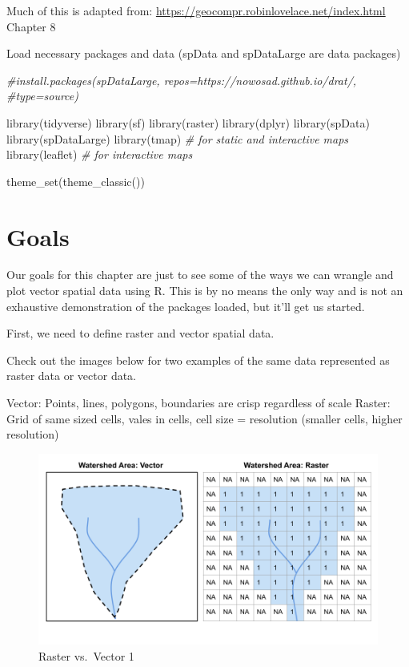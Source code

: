 \documentclass[
]{book}
\newenvironment{Shaded}{\begin{snugshade}}{\end{snugshade}}
\newcommand{\CommentTok}[1]{\textcolor[rgb]{0.56,0.35,0.01}{\textit{#1}}}
\newcommand{\FunctionTok}[1]{\textcolor[rgb]{0.00,0.00,0.00}{#1}}
\newcommand{\NormalTok}[1]{#1}
\begin{document}
Much of this is adapted from: \url{https://geocompr.robinlovelace.net/index.html} Chapter 8

Load necessary packages and data (spData and spDataLarge are data packages)

\begin{Shaded}
\begin{Highlighting}[]
\CommentTok{\#install.packages(\textquotesingle{}spDataLarge\textquotesingle{}, repos=\textquotesingle{}https://nowosad.github.io/drat/\textquotesingle{},}
\CommentTok{\#type=\textquotesingle{}source\textquotesingle{})}

\FunctionTok{library}\NormalTok{(tidyverse)}
\FunctionTok{library}\NormalTok{(sf)}
\FunctionTok{library}\NormalTok{(raster)}
\FunctionTok{library}\NormalTok{(dplyr)}
\FunctionTok{library}\NormalTok{(spData)}
\FunctionTok{library}\NormalTok{(spDataLarge)}
\FunctionTok{library}\NormalTok{(tmap)    }\CommentTok{\# for static and interactive maps}
\FunctionTok{library}\NormalTok{(leaflet) }\CommentTok{\# for interactive maps}

\FunctionTok{theme\_set}\NormalTok{(}\FunctionTok{theme\_classic}\NormalTok{())}
\end{Highlighting}
\end{Shaded}

\hypertarget{goals}{%
\section{Goals}\label{goals}}

Our goals for this chapter are just to see some of the ways we can wrangle and plot vector spatial data using R. This is by no means the only way and is not an exhaustive demonstration of the packages loaded, but it'll get us started.

First, we need to define raster and vector spatial data.

Check out the images below for two examples of the same data represented as raster data or vector data.

Vector: Points, lines, polygons, boundaries are crisp regardless of scale Raster: Grid of same sized cells, vales in cells, cell size = resolution (smaller cells, higher resolution)

\begin{figure}
\centering
\includegraphics{images/raster vector1.png}
\caption{Raster vs.~Vector 1}
\end{figure}
\end{document}
